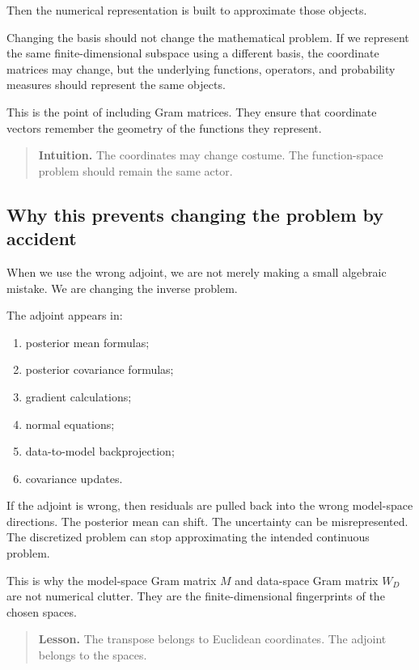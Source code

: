 \documentclass[11pt,a4paper]{book}
\newenvironment{intuition}
  {\begin{quote}\textbf{Intuition.}}
  {\end{quote}}
\newenvironment{lesson}
  {\begin{quote}\textbf{Lesson.}}
  {\end{quote}}
\begin{document}
Then the numerical representation is built to approximate those objects.

Changing the basis should not change the mathematical problem. If we represent
the same finite-dimensional subspace using a different basis, the coordinate
matrices may change, but the underlying functions, operators, and probability
measures should represent the same objects.

This is the point of including Gram matrices. They ensure that coordinate
vectors remember the geometry of the functions they represent.

\begin{intuition}
The coordinates may change costume. The function-space problem should remain
the same actor.
\end{intuition}

\subsection{Why this prevents changing the problem by accident}

When we use the wrong adjoint, we are not merely making a small algebraic
mistake. We are changing the inverse problem.

The adjoint appears in:
\begin{enumerate}[label=\arabic*.]
    \item posterior mean formulas;
    \item posterior covariance formulas;
    \item gradient calculations;
    \item normal equations;
    \item data-to-model backprojection;
    \item covariance updates.
\end{enumerate}

If the adjoint is wrong, then residuals are pulled back into the wrong
model-space directions. The posterior mean can shift. The uncertainty can be
misrepresented. The discretized problem can stop approximating the intended
continuous problem.

This is why the model-space Gram matrix $M$ and data-space Gram matrix $W_D$
are not numerical clutter. They are the finite-dimensional fingerprints of the
chosen spaces.

\begin{lesson}
The transpose belongs to Euclidean coordinates.
The adjoint belongs to the spaces.
\end{lesson}
\end{document}
